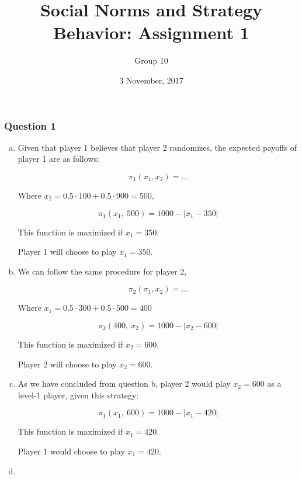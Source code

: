 \documentclass[a4paper]{article}
\author{Group 10}
\date{3 November, 2017}
\title{Social Norms and Strategy Behavior: Assignment 1}
\begin{document}
\maketitle

\subsubsection{Question 1}


\begin{enumerate}[(a)]

\item
Given that player 1 believes that player 2 randomizes, the expected
payoffs of player 1 are as follows:

\[\pi_{1}\left( x_{1},x_{2} \right) = \ldots\]

Where \(x_{2} = 0.5 \cdot 100 + 0.5 \cdot 900 = 500\),

\[\pi_{1}\left( x_{1},\ 500 \right) = 1000 - |x_{1} - 350|\]

This function is maximized if \(x_{1} = 350\).

Player 1 will choose to play \(x_{1} = 350\).

\item

We can follow the same procedure for player 2,

\[\pi_{2}\left( \sigma_{1},x_{2} \right) = \ldots\]

Where \(x_{1} = 0.5 \cdot 300 + 0.5 \cdot 500 = 400\)

\[\pi_{2}\left( 400,\ x_{2} \right) = 1000 - |x_{2} - 600|\]

This function is maximized if \(x_{2} = 600\).

Player 2 will choose to play \(x_{2} = 600\).

\item

As we have concluded from question b, player 2 would play
\(x_{2} = 600\) as a level-1 player, given this strategy:

\[\pi_{1}\left( x_{1},\ 600 \right) = 1000 - |x_{1} - 420|\]

This function is maximized if \(x_{1} = 420\).

Player 1 would choose to play \(x_{1} = 420\).

\item


\end{enumerate}
\end{document}
